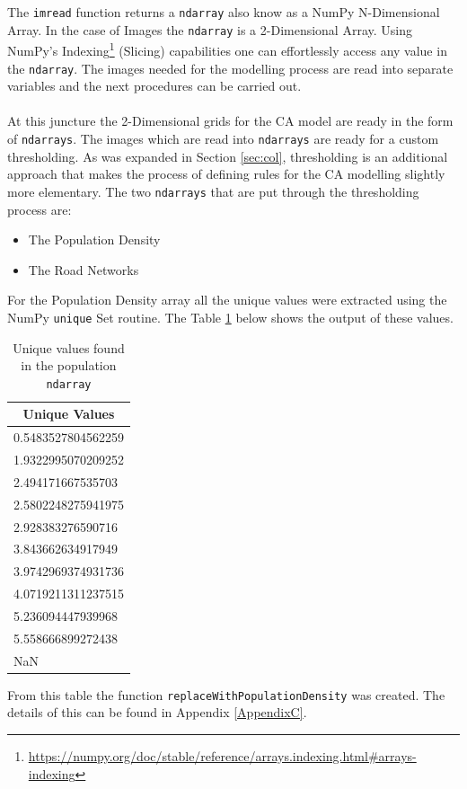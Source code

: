 The \texttt{imread} function returns a \texttt{ndarray} also know as a NumPy N-Dimensional Array. In the case of Images the \texttt{ndarray} is a 2-Dimensional Array. Using NumPy's Indexing\footnote{\url{https://numpy.org/doc/stable/reference/arrays.indexing.html\#arrays-indexing}} (Slicing) capabilities one can effortlessly access any value in the \texttt{ndarray}. The images needed for the modelling process are read into separate variables and the next procedures can be carried out.
\\\\
At this juncture the 2-Dimensional grids for the CA model are ready in the form of \texttt{ndarrays}. The images which are read into \texttt{ndarrays} are ready for a custom thresholding. As was expanded in Section \ref{sec:col}, thresholding is an additional approach that makes the process of defining rules for the CA modelling slightly more elementary. The two \texttt{ndarrays} that are put through the thresholding process are:
\begin{itemize}
\item The Population Density
\item The Road Networks
\end{itemize}
For the Population Density array all the unique values were extracted using the NumPy \texttt{unique} Set routine. The Table \ref{table:uniq} below shows the output of these values.
\begin{table}[H]
\caption{Unique values found in the population \texttt{ndarray}}
\label{table:uniq}
\centering
\begin{tabular}{@{}l@{}}
\toprule
\multicolumn{1}{c}{Unique Values} \\ \midrule
0.5483527804562259                \\
1.9322995070209252                \\
2.494171667535703                 \\
2.5802248275941975                \\
2.928383276590716                 \\
3.843662634917949                 \\
3.9742969374931736                \\
4.0719211311237515                \\
5.236094447939968                 \\
5.558666899272438                 \\
NaN                               \\ \bottomrule
\end{tabular}
\end{table}
From this table the function \texttt{replaceWithPopulationDensity} was created. The details of this can be found in Appendix \ref{AppendixC}.

